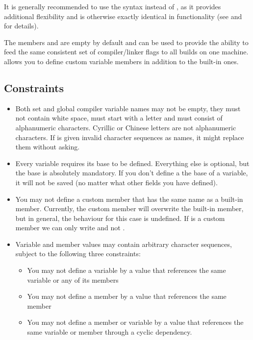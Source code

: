 It is generally recommended to use the syntax  instead of , as it provides additional flexibility and is otherwise exactly identical in functionality (see  and  for details).

The members  and  are empty by default and can be used to provide the ability to feed the same consistent set of compiler/linker flags to all builds on one machine. \codeblocks allows you to define custom variable members in addition to the built-in ones.

\subsection{Constraints}

\begin{itemize}
\item Both set and global compiler variable names may not be empty, they must not contain white space, must start with a letter and must consist of alphanumeric characters. Cyrillic or Chinese letters are not alphanumeric characters. If \codeblocks is given invalid character sequences as names, it might replace them without asking.
\item Every variable requires its base to be defined. Everything else is optional, but the base is absolutely mandatory. If you don't define a the base of a variable, it will not be saved (no matter what other fields you have defined).
\item You may not define a custom member that has the same name as a built-in member. Currently, the custom member will overwrite the built-in member, but in general, the behaviour for this case is undefined. If  is a custom member we can only write  and not .
\item Variable and member values may contain arbitrary character sequences, subject to the following three constraints:
\begin{itemize}
\item You may not define a variable by a value that references the same variable or any of its members
\item You may not define a member by a value that references the same member
\item You may not define a member or variable by a value that references the same variable or member through a cyclic dependency.
\end{itemize}
\end{itemize}

